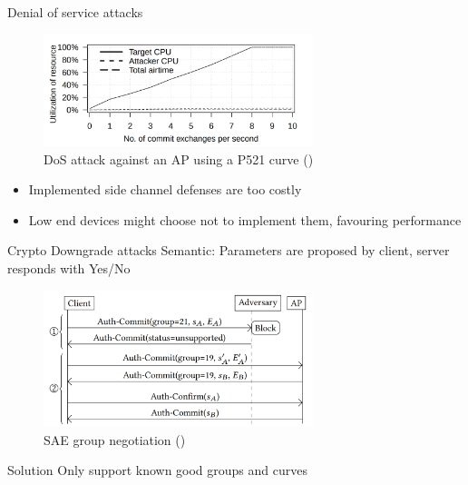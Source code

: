 \documentclass[xcolor=table]{bredelebeamer}
\begin{document}
\begin{frame}{Denial of service attacks}
    \begin{figure}
        \centering
        \includegraphics[width=0.7\textwidth]{dos.png}
        \caption{DoS attack against an AP using a P521 curve (\cite{vanhoef-sp2020-dragonblood})}
        \label{fig:my_label}
    \end{figure}
    \begin{itemize}
        \item Implemented side channel defenses are too costly
        \item Low end devices might choose not to implement them, favouring performance
    \end{itemize}
\end{frame}
\begin{frame}{Crypto Downgrade attacks}
    Semantic: Parameters are proposed by client, server responds with Yes/No
    \begin{figure}
        \centering
        \includegraphics[width=0.7\textwidth]{downgrade.png}
        \caption{SAE group negotiation (\cite{vanhoef-sp2020-dragonblood})}
        \label{fig:my_label}
    \end{figure}

    \begin{exampleblock}{Solution}
    Only support known good groups and curves 
    \end{exampleblock}
\end{frame}
\end{document}
